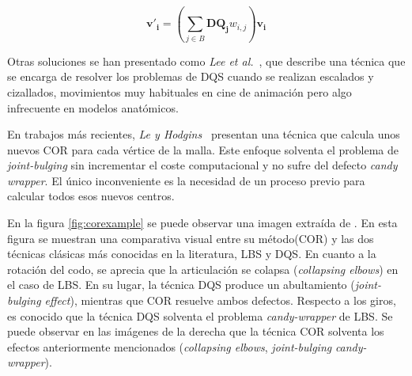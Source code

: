 \begin{equation}
\label{eqn:DQS}
\mathbf{v'_{i}} = (\sum_{j \in B} \mathbf{DQ_{j}}w_{i,j}) \mathbf{v_{i}}
\end{equation}

Otras soluciones se han presentado como \emph{Lee et al.}~\cite{Lee2013}, que describe una técnica que se encarga de resolver los problemas de \ac{DQS} cuando se realizan escalados y cizallados, movimientos muy habituales en cine de animación pero algo infrecuente en modelos anatómicos.

En trabajos más recientes, \emph{Le y Hodgins}~\cite{le2016real} presentan una técnica que calcula unos nuevos \acl{COR} para cada vértice de la malla. Este enfoque solventa el problema de \emph{joint-bulging} sin incrementar el coste computacional y no sufre del defecto \emph{candy wrapper}. El único inconveniente es la necesidad de un proceso previo para calcular todos esos nuevos centros.

En la figura \ref{fig:corexample} se puede observar una imagen extraída de \cite{le2016real}. En esta figura se muestran  una comparativa visual entre su método(\ac{COR}) y las dos técnicas clásicas más conocidas en la literatura, \ac{LBS} y \ac{DQS}. En cuanto a la rotación del codo, se aprecia que la articulación se colapsa (\emph{collapsing elbows}) en el caso de \ac{LBS}. En su lugar, la técnica \ac{DQS} produce un abultamiento (\emph{joint-bulging effect}), mientras que \ac{COR} resuelve ambos defectos. Respecto a los giros, es conocido que la técnica \ac{DQS} solventa el problema \emph{candy-wrapper} de \ac{LBS}. Se puede observar en las imágenes de la derecha que la técnica \ac{COR} solventa los efectos anteriormente mencionados (\emph{collapsing elbows}, \emph{joint-bulging} \emph{candy-wrapper}). 


